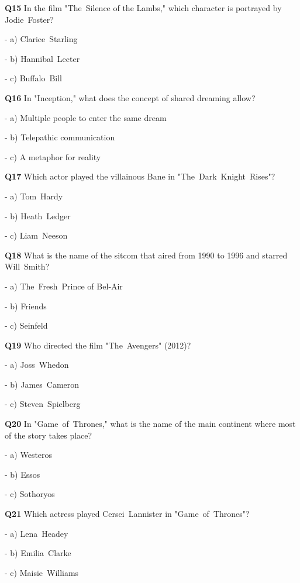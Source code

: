 \textbf{Q15} In the film "The Silence of the Lambs," which character is portrayed by Jodie Foster?\par
\quad - a) Clarice Starling\par
\quad - b) Hannibal Lecter\par
\quad - c) Buffalo Bill\par

\textbf{Q16} In "Inception," what does the concept of shared dreaming allow?\par
\quad - a) Multiple people to enter the same dream\par
\quad - b) Telepathic communication\par
\quad - c) A metaphor for reality\par

\textbf{Q17} Which actor played the villainous Bane in "The Dark Knight Rises"?\par
\quad - a) Tom Hardy\par
\quad - b) Heath Ledger\par
\quad - c) Liam Neeson\par

\textbf{Q18} What is the name of the sitcom that aired from 1990 to 1996 and starred Will Smith?\par
\quad - a) The Fresh Prince of Bel‑Air\par
\quad - b) Friends\par
\quad - c) Seinfeld\par

\textbf{Q19} Who directed the film "The Avengers" (2012)?\par
\quad - a) Joss Whedon\par
\quad - b) James Cameron\par
\quad - c) Steven Spielberg\par

\textbf{Q20} In "Game of Thrones," what is the name of the main continent where most of the story takes place?\par
\quad - a) Westeros\par
\quad - b) Essos\par
\quad - c) Sothoryos\par

\textbf{Q21} Which actress played Cersei Lannister in "Game of Thrones"?\par
\quad - a) Lena Headey\par
\quad - b) Emilia Clarke\par
\quad - c) Maisie Williams\par

